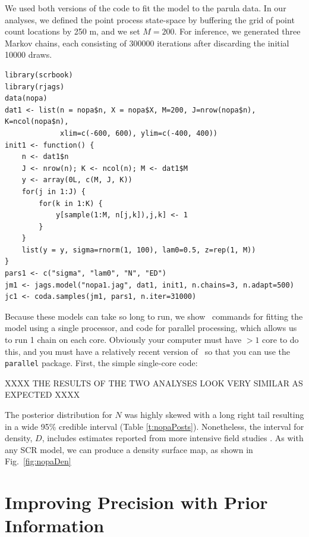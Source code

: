 We used both versions of the code to fit the
model to the parula data. In our analyses, we defined the point process
state-space by buffering the grid of point count locations by 250 m,
and we set $M=200$. For inference, we generated three Markov chains,
each consisting of 300000 iterations after discarding the initial 10000
draws. %
\begin{small}
\begin{verbatim}
library(scrbook)
library(rjags)
data(nopa)
dat1 <- list(n = nopa$n, X = nopa$X, M=200, J=nrow(nopa$n), K=ncol(nopa$n),
             xlim=c(-600, 600), ylim=c(-400, 400))
init1 <- function() {
    n <- dat1$n
    J <- nrow(n); K <- ncol(n); M <- dat1$M
    y <- array(0L, c(M, J, K))
    for(j in 1:J) {
        for(k in 1:K) {
            y[sample(1:M, n[j,k]),j,k] <- 1
        }
    }
    list(y = y, sigma=rnorm(1, 100), lam0=0.5, z=rep(1, M))
}
pars1 <- c("sigma", "lam0", "N", "ED")
jm1 <- jags.model("nopa1.jag", dat1, init1, n.chains=3, n.adapt=500)
jc1 <- coda.samples(jm1, pars1, n.iter=31000)
\end{verbatim}
\end{small}




Because these models can take so long to run, we show \R~commands for
fitting the model using a single processor, and code for parallel
processing, which allows us to run 1 chain on each core. Obviously
your computer must have $>1$ core to do this, and you must have a
relatively recent version of \R~so that you can use the {\tt parallel}
package. First, the simple single-core code:




XXXX THE RESULTS OF THE TWO ANALYSES LOOK VERY SIMILAR AS EXPECTED XXXX

The posterior distribution for
$N$ was highly skewed with a long right tail resulting in a wide 95\%
credible interval (Table \ref{t:nopaPosts}). Nonetheless, the interval
for density, $D$, includes estimates reported from more intensive field
studies \citep{moldenhaer_regelski:1996}. As with any SCR model,
we can produce a density surface map, as shown in Fig.~\ref{fig:nopaDen}






\section{Improving Precision with Prior Information}
\label{Sect.precision}

